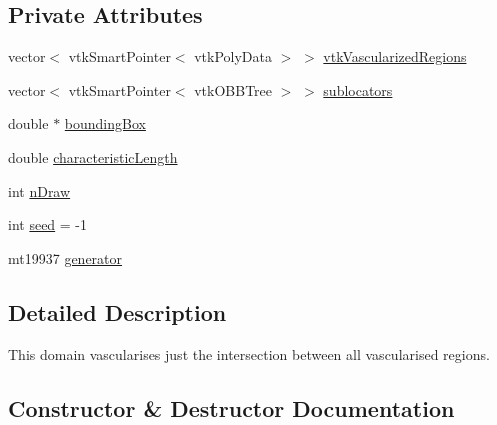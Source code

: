 \subsection*{Private Attributes}
\begin{DoxyCompactItemize}
\item 
vector$<$ vtk\+Smart\+Pointer$<$ vtk\+Poly\+Data $>$ $>$ \hyperlink{class_intersection_vascularized_domain_a0cfc67dad7db0d7c95b50eb6992c8339}{vtk\+Vascularized\+Regions}
\item 
vector$<$ vtk\+Smart\+Pointer$<$ vtk\+O\+B\+B\+Tree $>$ $>$ \hyperlink{class_intersection_vascularized_domain_aedf9a331b6785010abad7111b447a418}{sublocators}
\item 
double $\ast$ \hyperlink{class_intersection_vascularized_domain_a09393f0750ed293a45953f3a080cd7d6}{bounding\+Box}
\item 
double \hyperlink{class_intersection_vascularized_domain_a6cd023b45323ac979b45ff56597ad621}{characteristic\+Length}
\item 
int \hyperlink{class_intersection_vascularized_domain_a98a16d98d16b37b13593d7a2aee872f3}{n\+Draw}
\item 
int \hyperlink{class_intersection_vascularized_domain_abe078f4d223d21554d6f6709d5db47b0}{seed} = -\/1
\item 
mt19937 \hyperlink{class_intersection_vascularized_domain_a6245d7a96b0c7e453080ccde826ea654}{generator}
\end{DoxyCompactItemize}


\subsection{Detailed Description}
This domain vascularises just the intersection between all vascularised regions. 

\subsection{Constructor \& Destructor Documentation}
